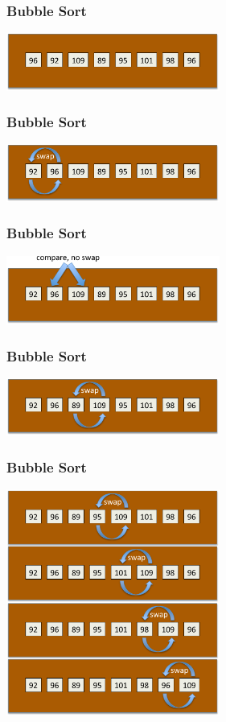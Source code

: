 \documentclass{beamer} %
\begin{document}
\begin{frame}
  \frametitle{Bubble Sort}
  \centering
  \includegraphics[width=70mm]{assets/swapping1-cropped.pdf}
\end{frame}
\begin{frame}
  \frametitle{Bubble Sort}
  \centering
  \includegraphics[width=70mm]{assets/swapping2-cropped.pdf}
\end{frame}
\begin{frame}
  \frametitle{Bubble Sort}
  \centering
  \includegraphics[width=70mm]{assets/swapping3-cropped.pdf}
\end{frame}
\begin{frame}
  \frametitle{Bubble Sort}
  \centering
  \includegraphics[width=70mm]{assets/swapping4-cropped.pdf}
\end{frame}
\begin{frame}
  \frametitle{Bubble Sort}
  \centering
  \includegraphics[width=70mm]{assets/swapping5-cropped.pdf}
\end{frame}
\end{document}
